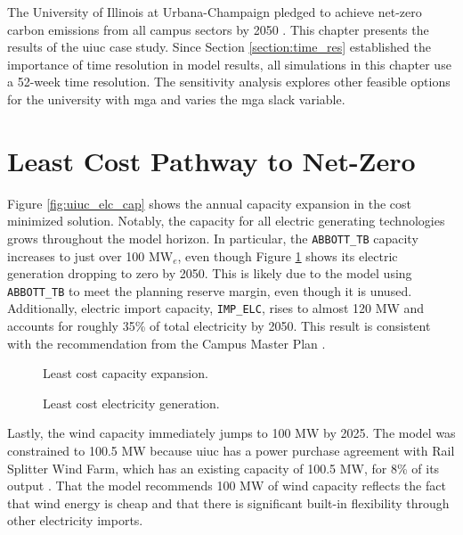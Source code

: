 The University of Illinois at Urbana-Champaign pledged to achieve net-zero carbon
emissions from all campus sectors by 2050
\cite{institute_for_sustainability_energy_and_environment_illinois_2015}. This
chapter presents the results of the \gls{uiuc} case study. Since Section
\ref{section:time_res} established the importance of time resolution in model results,
all simulations in this chapter use a 52-week time resolution. The sensitivity
analysis explores other feasible options for the university with \gls{mga} and
varies the \gls{mga} slack variable.

\section{Least Cost Pathway to Net-Zero}
Figure \ref{fig:uiuc_elc_cap} shows the annual capacity expansion in the cost
minimized solution. Notably, the capacity for all electric generating technologies
grows throughout the model horizon. In particular, the \texttt{ABBOTT\_TB} capacity
increases to just over 100 MW$_e$, even though Figure \ref{fig:uiuc_elc_gen}
shows its electric generation dropping to zero by 2050. This is likely due to
the model using \texttt{ABBOTT\_TB} to meet the planning reserve margin, even
though it is unused. Additionally, electric import capacity, \texttt{IMP\_ELC}, rises
to almost 120 MW and accounts for roughly 35\% of total electricity by 2050.
This result is consistent with the recommendation from the Campus Master Plan
\cite{affiliated_engineers_inc_utilities_2015}.

\begin{figure}[H]
  \begin{minipage}{0.48\textwidth}
    \captionsetup{type=figure}
    \centering
    \resizebox{\columnwidth}{!}{}
    \caption[]{Least cost capacity expansion.}
    \label{fig:uiuc_elc_cap}
  \end{minipage}
  \begin{minipage}{0.48\textwidth}
    \centering
    \resizebox{\columnwidth}{!}{}
    \caption[]{Least cost electricity generation.}
    \label{fig:uiuc_elc_gen}
  \end{minipage}
\end{figure}

Lastly, the wind capacity immediately jumps to 100 MW by 2025. The model was
constrained to 100.5 MW because \gls{uiuc} has a power purchase agreement with
Rail Splitter Wind Farm, which has an existing capacity of 100.5 MW, for 8\% of
its output \cite{breitweiser_wind_2016}. That the model recommends 100 MW of
wind capacity reflects the fact that wind energy is cheap and that there is significant
built-in flexibility through other electricity imports.

